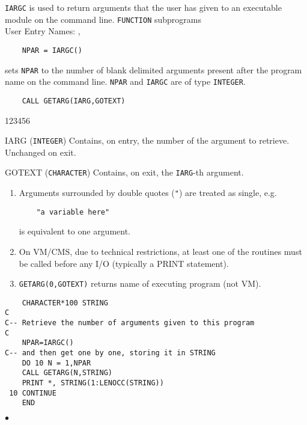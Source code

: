                         
\Submitter{}                             
                   
{\tt IARGC} is used to return arguments that the user has given
to an executable module on the command line.
\Structure
{\tt FUNCTION} subprograms\\
User Entry Names: , 
\Usage
\begin{verbatim}
    NPAR = IARGC()
\end{verbatim}
sets {\tt NPAR} to the number of blank delimited arguments present after
the program name on the command line. {\tt NPAR} and {\tt IARGC} are
of type {\tt INTEGER}.
\begin{verbatim}
    CALL GETARG(IARG,GOTEXT)
\end{verbatim}
\begin{DLtt}{123456}
\item [IARG] ({\tt INTEGER}) Contains, on entry, the number of the
argument to retrieve. Unchanged on exit.
\item [GOTEXT] ({\tt CHARACTER}) Contains, on exit, the {\tt IARG}-th
argument.
\end{DLtt}
\Notes
\begin{enumerate}
\item Arguments surrounded by double quotes ({\tt "}) are treated as
single, e.g.
\begin{verbatim}
    "a variable here"
\end{verbatim}
is equivalent to one argument.
\item On VM/CMS, due to technical restrictions, at least one of the
routines must be called before any I/O (typically a PRINT statement).
\item {\tt GETARG(0,GOTEXT)} returns name of executing program (not VM).
\end{enumerate}
\Example
\begin{verbatim}
    CHARACTER*100 STRING
C
C-- Retrieve the number of arguments given to this program
C
    NPAR=IARGC()
C-- and then get one by one, storing it in STRING
    DO 10 N = 1,NPAR
    CALL GETARG(N,STRING)
    PRINT *, STRING(1:LENOCC(STRING))
 10 CONTINUE
    END
\end{verbatim}
$\bullet$

